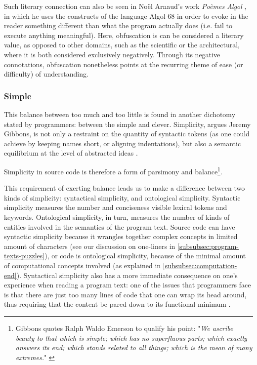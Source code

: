 Such literary connection can also be seen in Noël Arnaud's work \emph{Poèmes Algol} \citep{arnaud_poemes_1968}, in which he uses the constructs of the language Algol 68 in order to evoke in the reader something different than what the program actually does (i.e. fail to execute anything meaningful). Here, obfuscation is can be considered a literary value, as opposed to other domains, such as the scientific or the architectural, where it is both considered exclusively negatively. Through its negative connotations, obfuscation nonetheless points at the recurring theme of ease (or difficulty) of understanding.

\subsubsection{Simple}
\label{subsubsec:simple}

This balance between too much and too little is found in another dichotomy stated by programmers: between the simple and clever. Simplicity, argues Jeremy Gibbons, is not only a restraint on the quantity of syntactic tokens (as one could achieve by keeping names short, or aligning indentations), but also a semantic equilibrium at the level of abstracted ideas \citep{gibbons_beauty_2012}.

Simplicity in source code is therefore a form of parsimony and balance\footnote{Gibbons quotes Ralph Waldo Emerson to qualify his point: "\emph{We ascribe beauty to that which is simple; which has no superfluous parts; which exactly answers its end; which stands related to all things; which is the mean of many extremes.}" \citep{gibbons_beauty_2012}}.

This requirement of exerting balance  leads us to make a difference between two kinds of simplicity: syntactical simplicity, and ontological simplicity. Syntactic simplicity measures the number and conciseness visible lexical tokens and keywords. Ontological simplicity, in turn, measures the number of kinds of entities involved in the semantics of the program text. Source code can have syntactic simplicity because it wrangles together complex concepts in limited amount of characters (see our discussion on one-liners in \ref{subsubsec:program-texts-puzzles}), or code is ontological simplicity, because of the minimal amount of computational concepts involved (as explained in \ref{subsubsec:computation-end}). Syntactical simplicity also has a more immediate consequence on one's experience when reading a program text: one of the issues that programmers face is that there are just too many lines of code that one can wrap its head around, thus requiring that the content be pared down to its functional minimum \citep{butler_programmer_2012}.

